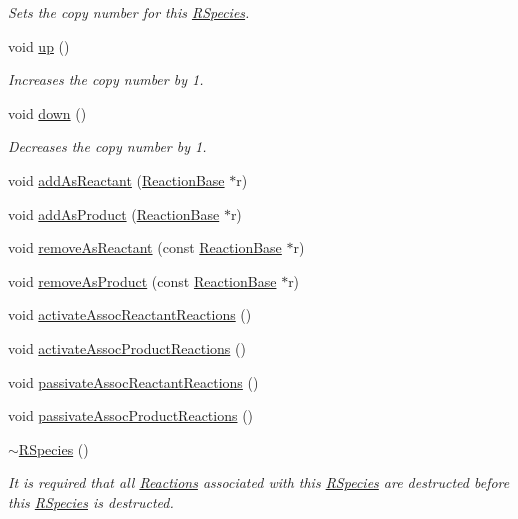 \begin{DoxyCompactItemize}
\begin{DoxyCompactList}\small\item\em Sets the copy number for this \hyperlink{classchem_1_1RSpecies}{R\-Species}. \end{DoxyCompactList}\item 
void \hyperlink{classchem_1_1RSpecies_ae721e3c649a12e0a81bc6b77afe23f38}{up} ()
\begin{DoxyCompactList}\small\item\em Increases the copy number by 1. \end{DoxyCompactList}\item 
void \hyperlink{classchem_1_1RSpecies_a0b9db54a1407d689be7477e77b4bb1c6}{down} ()
\begin{DoxyCompactList}\small\item\em Decreases the copy number by 1. \end{DoxyCompactList}\item 
void \hyperlink{classchem_1_1RSpecies_a2f69141d801e4660ab411953fef74ea2}{add\-As\-Reactant} (\hyperlink{classchem_1_1ReactionBase}{Reaction\-Base} $\ast$r)
\item 
void \hyperlink{classchem_1_1RSpecies_a0df14f94c944f38f8794dc9229f8079c}{add\-As\-Product} (\hyperlink{classchem_1_1ReactionBase}{Reaction\-Base} $\ast$r)
\item 
void \hyperlink{classchem_1_1RSpecies_ab8f32e15791cfddea7cf4cac5a39c0fa}{remove\-As\-Reactant} (const \hyperlink{classchem_1_1ReactionBase}{Reaction\-Base} $\ast$r)
\item 
void \hyperlink{classchem_1_1RSpecies_a951496132075bd03ba51ba4d753f0d7f}{remove\-As\-Product} (const \hyperlink{classchem_1_1ReactionBase}{Reaction\-Base} $\ast$r)
\item 
void \hyperlink{classchem_1_1RSpecies_a1589cd0e045a084a32dff4a02612d4a3}{activate\-Assoc\-Reactant\-Reactions} ()
\item 
void \hyperlink{classchem_1_1RSpecies_ab275b0c9fb9352abe35a3bd68f3917fb}{activate\-Assoc\-Product\-Reactions} ()
\item 
void \hyperlink{classchem_1_1RSpecies_a0c33c29f86ee16b84151bc5f38953076}{passivate\-Assoc\-Reactant\-Reactions} ()
\item 
void \hyperlink{classchem_1_1RSpecies_aff8862396958db832848c94135282f1e}{passivate\-Assoc\-Product\-Reactions} ()
\item 
\hyperlink{classchem_1_1RSpecies_a3c875e360f7f53b2ca8bd30f7dbbb7ed}{$\sim$\-R\-Species} ()
\begin{DoxyCompactList}\small\item\em It is required that all \hyperlink{classchem_1_1Reaction}{Reactions} associated with this \hyperlink{classchem_1_1RSpecies}{R\-Species} are destructed before this \hyperlink{classchem_1_1RSpecies}{R\-Species} is destructed. \end{DoxyCompactList}\item 

\end{DoxyCompactItemize}
